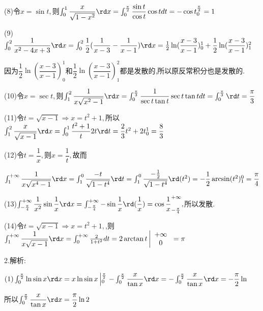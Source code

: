(8)令$x = \sin t,$则$\int_0^1 {\dfrac{x}{{\sqrt {1 - {x^2}} }}} \rd x = \int_0^{\frac{\pi }{2}} {\dfrac{{\sin t}}{{\cos t}}\cos tdt =  - \cos t_0^{\frac{\pi }{2}}}  = 1$

(9)$\int_0^2 {\dfrac{1}{{{x^2} - 4x + 3}}\rd x}  = \int_0^2 {\dfrac{1}{2}} (\dfrac{1}{{x - 3}} - \dfrac{1}{{x - 1}})\rd x = \frac{1}{2}\ln (\dfrac{{x - 3}}{{x - 1}})_0^1 + \dfrac{1}{2}\ln (\dfrac{{x - 3}}{{x - 1}})_1^2$

因为$\dfrac{1}{2}\ln (\dfrac{{x - 3}}{{x - 1}})_0^1$和$\dfrac{1}{2}\ln (\dfrac{{x - 3}}{{x - 1}})_1^2$都是发散的,所以原反常积分也是发散的.

(10)令$x = \sec t,$则$\int_1^2 {\dfrac{1}{{x\sqrt {{x^2} - 1} }}\rd x}  = \int_0^{\frac{\pi }{3}} {\dfrac{1}{{\sec t\tan t}}\sec t\tan tdt = \int_0^{\frac{\pi }{3}} {\rd t}  = \dfrac{\pi }{3}} $

(11)令$t = \sqrt {x - 1}  \Rightarrow x = {t^2} + 1,$所以$\int_1^2 {\dfrac{x}{{\sqrt {x - 1} }}\rd x}  = \int_0^1 {\dfrac{{{t^2} + 1}}{t}} 2t\rd t = \dfrac{2}{3}{t^2} + 2t_0^1 = \dfrac{8}{3}$

(12)令$t = \dfrac{1}{x},$则$x = \dfrac{1}{t},$故而

$\int_1^{ + \infty } {\dfrac{1}{{x\sqrt {{x^4} - 1} }}\rd x}  = \int_1^0 {\dfrac{{ - t}}{{\sqrt {1 - {t^4}} }}} \rd t = \int_1^0 {\dfrac{{ - \frac{1}{2}}}{{\sqrt {1 - {t^4}} }}} \rd ({t^2}) =  - \dfrac{1}{2}\arcsin ({t^2})_1^0 = \dfrac{\pi }{4}$

(13)$\int_{ - \frac{\pi }{4}}^{ + \infty } {\dfrac{1}{{{x^2}}}} \sin \dfrac{1}{x}\rd x = \int_{ - \frac{\pi }{4}}^{ + \infty } { - \sin \dfrac{1}{x}} \rd (\dfrac{1}{x}) = \cos \dfrac{1}{x}_{ - \frac{\pi }{4}}^{ + \infty },$所以发散.

(14)令$t = \sqrt {x - 1}  \Rightarrow x = {t^2} + 1,$,则$\int_1^{ + \infty } {\dfrac{1}{{x\sqrt {x - 1} }}\rd x = \int_0^{ + \infty } {\frac{2}{{1 + {t^2}}}} } dt = 2\arctan t\left| {\begin{array}{*{20}{c}}
  { + \infty } \\ 
  0 
\end{array}} \right. = \pi $

2.解析:

$(1)\int_0^{\frac{\pi }{2}} {\ln \sin x\rd x = x\ln \sin x\left| {_0^{\frac{\pi }{2}}} \right. - } \int_0^{\frac{\pi }{2}} {\dfrac{x}{{\tan x}}} \rd x =  - \int_0^{\frac{\pi }{2}} {\dfrac{x}{{\tan x}}} \rd x =  - \dfrac{\pi }{2}\ln $

所以$\int_0^{\frac{\pi }{2}} {\dfrac{x}{{\tan x}}} \rd x = \dfrac{\pi }{2}\ln 2$

